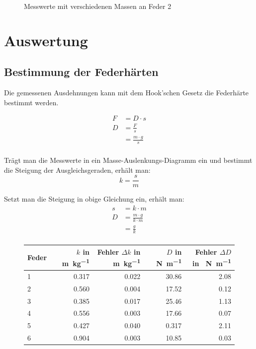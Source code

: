 \begin{figure}[H]
\centering
{}
\caption{Messwerte mit verschiedenen Massen an Feder 2}
\end{figure}


\section{Auswertung}
\subsection{Bestimmung der Federhärten}
Die gemessenen Ausdehnungen kann mit dem Hook'schen Gesetz die Federhärte bestimmt werden.

\begin{align*}
F &= D \cdot s \\
D &= \frac{F}{s} \\
  &= \frac{m \cdot g}{s} \\
\end{align*}

Trägt man die Messwerte in ein Masse-Auslenkungs-Diagramm ein und bestimmt die Steigung der Ausgleichsgeraden, erhält man:
$$k = \frac{s}{m}$$

Setzt man die Steigung in obige Gleichung ein, erhält man:
\begin{align*}
s &= k \cdot m \\
D &= \frac{m \cdot g}{k \cdot m} \\
  &= \frac{g}{k} \\
\end{align*}

\begin{figure}[H]
\centering
\begin{tabular}{lrrrr}
Feder & $k$ in \SI{}{\meter\per\kilo\gram} & Fehler $\Delta k$ in \SI{}{\meter\per\kilo\gram} & $D$ in \SI{}{\newton\per\meter} & Fehler $\Delta D$ in \SI{}{\newton\per\meter} \\ \hline
1 & \num{0.317} & \num{0.022} & \num{30.86} & \num{2.08}\\
2 & \num{0.560} & \num{0.004} & \num{17.52} & \num{0.12}\\
3 & \num{0.385} & \num{0.017} & \num{25.46} & \num{1.13}\\
4 & \num{0.556} & \num{0.003} & \num{17.66} & \num{0.07}\\
5 & \num{0.427} & \num{0.040} & \num{0.317} & \num{2.11}\\
6 & \num{0.904} & \num{0.003} & \num{10.85} & \num{0.03}\\
\end{tabular}
\end{figure}

